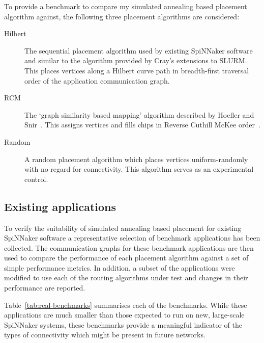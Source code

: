 			To provide a benchmark to compare my simulated annealing based placement
			algorithm against, the following three placement algorithms are
			considered:
			
			\begin{description}
				
				\item[Hilbert] The sequential placement algorithm used by existing
				SpiNNaker software and similar to the algorithm provided by Cray's
				extensions to SLURM. This places vertices along a Hilbert curve path in
				breadth-first traversal order of the application communication graph.
				
				\item[RCM] The `graph similarity based mapping' algorithm described by
				Hoefler and Snir~\cite{hoefler11}. This assigns vertices and fills
				chips in Reverse Cuthill McKee order~\cite{cuthill69}.
				
				\item[Random] A random placement algorithm which places vertices
				uniform-randomly with no regard for connectivity. This algorithm serves
				as an experimental control.
				
			\end{description}
			
		\subsection{Existing applications}
			
			\label{sec:existing-applications}
			
			To verify the suitability of simulated annealing based placement for
			existing SpiNNaker software a representative selection of benchmark
			applications has been collected. The communication graphs for these
			benchmark applications are then used to compare the performance of each
			placement algorithm against a set of simple performance metrics. In
			addition, a subset of the applications were modified to use each of the
			routing algorithms under test and changes in their performance are
			reported.
			
			Table~\ref{tab:real-benchmarks} summarises each of the benchmarks. While
			these applications are much smaller than those expected to run on new,
			large-scale SpiNNaker systems, these benchmarks provide a meaningful
			indicator of the types of connectivity which might be present in future
			networks.
			

